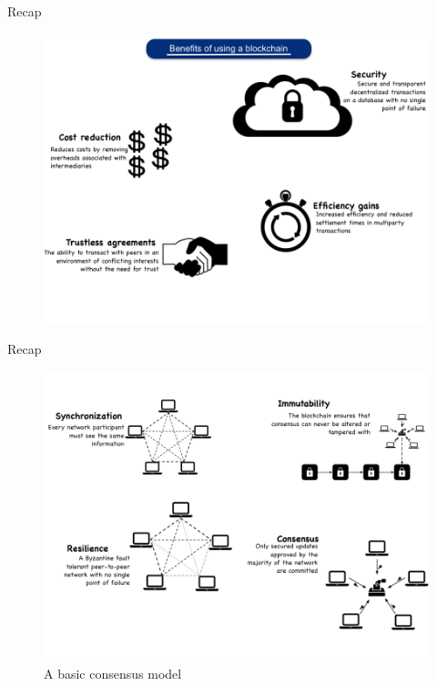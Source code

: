 \documentclass[11pt]{beamer}
\begin{document}

\begin{frame}{Recap}
	\begin{figure}[]
		\centering
		\includegraphics  [scale=0.3]{Images/benefits}
	\end{figure}
\end{frame}


\begin{frame}{Recap}
	\begin{figure}[]
		\centering
		\includegraphics  [scale=0.3]{Images/consensus}
		\caption{A basic consensus model}
	\end{figure}
\end{frame}
\end{document}
